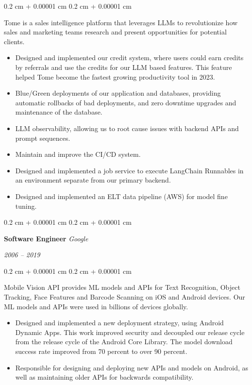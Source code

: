 \documentclass[12pt, letterpaper]{article}
\newenvironment{highlights}{
    \begin{itemize}[
        topsep=0.10 cm,
        parsep=0.10 cm,
        partopsep=0pt,
        itemsep=0pt,
        leftmargin=0.4 cm + 10pt
    ]
}{
    \end{itemize}
} %
\newenvironment{onecolentry}{
    \begin{adjustwidth}{
        0.2 cm + 0.00001 cm
    }{
        0.2 cm + 0.00001 cm
    }
}{
    \end{adjustwidth}
} %
\newenvironment{twocolentry}[2][]{
    \onecolentry
    \def\secondColumn{#2}
    \setcolumnwidth{\fill, 4.5 cm}
    \begin{paracol}{2}
}{
    \switchcolumn \raggedleft \secondColumn
    \end{paracol}
    \endonecolentry
} %
\begin{document}
        \vspace{0.10 cm}
        \begin{onecolentry}
            Tome is a sales intelligence platform that leverages LLMs to revolutionize how sales and marketing teams research and present opportunities for potential clients.
            \begin{highlights}
                \item Designed and implemented our credit system, where users could earn credits by referrals and use the credits for our LLM based features.  This feature helped Tome become the fastest growing productivity tool in 2023.
                \item Blue/Green deployments of our application and databases, providing automatic rollbacks of bad deployments, and zero downtime upgrades and maintenance of the database.
                \item LLM observability, allowing us to root cause issues with backend APIs and prompt sequences.
                \item Maintain and improve the CI/CD system.
                \item Designed and implemented a job service to execute LangChain Runnables in an environment separate from our primary backend.
                \item Designed and implemented an ELT data pipeline (AWS) for model fine tuning.
            \end{highlights}
        \end{onecolentry}

        \vspace{0.2 cm}

        \begin{twocolentry}{
        \textit{2006 – 2019}}
            \textbf{Software Engineer}
            \textit{Google}
        \end{twocolentry}

        \vspace{0.10 cm}

        \begin{onecolentry}
            Mobile Vision API provides ML models and APIs for Text Recognition, Object Tracking, Face Features and Barcode Scanning on iOS and Android devices.  Our ML models and APIs were used in billions of devices globally.
            \begin{highlights}
                \item Designed and implemented a new deployment strategy, using Android Dynamic Apps. This work improved security and decoupled our release cycle from the release cycle of the Android Core Library.  The model download success rate improved from 70 percent to over 90 percent. 
                \item Responsible for designing and deploying new APIs and models on Android, as well as maintaining older APIs for backwards compatibility.
            \end{highlights}
        \end{onecolentry}
        
\end{document}
